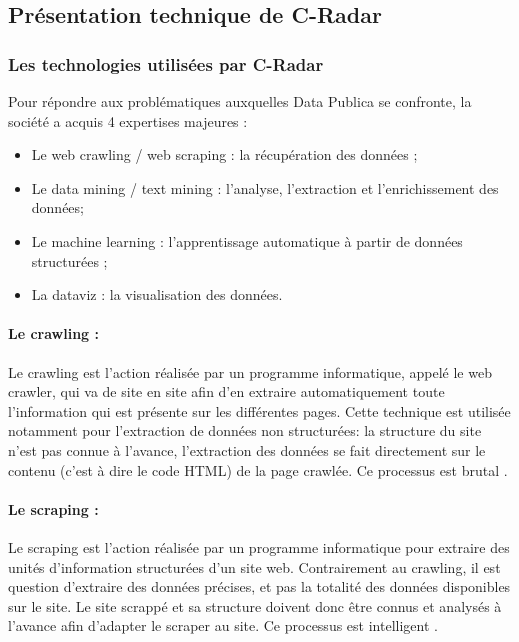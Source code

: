     \subsection{Présentation technique de C-Radar}
        \subsubsection{Les technologies utilisées par C-Radar}
            Pour répondre aux problématiques auxquelles Data Publica se confronte, la société a acquis 4 expertises majeures :
            \begin{itemize}
                \item Le web crawling / web scraping : la récupération des données ;
                \item Le data mining / text mining : l'analyse, l’extraction et l’enrichissement des données;
                \item Le machine learning : l'apprentissage automatique à partir de données structurées ;
                \item La dataviz : la visualisation des données.
            \end{itemize}

            \paragraph{Le crawling :}
                Le crawling est l’action réalisée par un programme informatique, appelé le web crawler, qui va de site en site afin d’en extraire automatiquement toute l’information qui est présente sur les différentes pages. Cette technique est utilisée notamment pour l’extraction de données non structurées: la structure du site n’est pas connue à l’avance, l’extraction des données se fait directement sur le contenu (c’est à dire le code HTML) de la page crawlée. Ce processus est \og brutal \fg.

            \paragraph{Le scraping :}
                Le scraping est l’action réalisée par un programme informatique pour extraire des unités d’information structurées d’un site web. Contrairement au crawling, il est question d’extraire des données précises, et pas la totalité des données disponibles sur le site. Le site \og scrappé \fg et sa structure doivent donc être connus et analysés à l’avance afin d’adapter le scraper au site. Ce processus est \og intelligent \fg.

